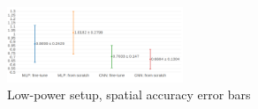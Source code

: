 
\begin{figure}[h!]
\begin{center}
\includegraphics[width=0.47\textwidth]{lp_avg_better_crop.png}
\end{center}
\caption{Low-power setup, spatial accuracy error bars}
\label{fig:lp_avg}
\end{figure}





